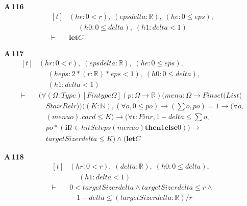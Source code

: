 \noindent\textbf{A\,116}\quad{}
{\footnotesize\[ \begin{aligned}[t]
&(\mathit{hr} : 0<\mathit{r}),\; (\mathit{eps} \mathit{delta} : \mathbb{R} ),\; (\mathit{he} : 0 \leq \mathit{eps}),\\
&\quad \; (\mathit{h0} : 0 \leq \mathit{delta}),\; (\mathit{h1} : \mathit{delta}<1)\\
\vdash\;&\mathbf{let} \mathit{C}
\end{aligned} \]}

\noindent\textbf{A\,117}\quad{}
{\footnotesize\[ \begin{aligned}[t]
&(\mathit{hr} : 0<\mathit{r}),\; (\mathit{eps} \mathit{delta} : \mathbb{R} ),\; (\mathit{he} : 0 \leq \mathit{eps}),\\
&\quad \; (\mathit{heps} : 2*(\mathit{r} : \mathbb{R} )*\mathit{eps}<1),\; (\mathit{h0} : 0 \leq \mathit{delta}),\\
&\quad \; (\mathit{h1} : \mathit{delta}<1)\\
\vdash\;&(\forall (\Omega : \mathit{Type}) [\mathit{Fintype} \Omega ] (\mathit{p} : \Omega \to \mathbb{R} ) (\mathit{menu} : \Omega \to \mathit{Finset} (\mathit{List} (\\
&\quad \mathit{StairRel} \mathit{r}))) (\mathit{K} : \mathbb{N} ), (\forall \mathit{o},0 \leq \mathit{p} \mathit{o}) \to (\textstyle\sum \mathit{o},\mathit{p} \mathit{o})=1 \to (\forall \mathit{o},\\
&\quad (\mathit{menu} \mathit{o}).\mathit{card} \leq \mathit{K}) \to (\forall \mathit{t} : \mathit{Fin} \mathit{r},1-\mathit{delta} \leq \textstyle\sum \mathit{o},\\
&\quad \mathit{p} \mathit{o}*(\mathbf{if} \mathit{t} \in \mathit{hitSet} \mathit{eps} (\mathit{menu} \mathit{o}) \mathbf{then} 1 \mathbf{else} 0)) \to\\
&\quad \mathit{targetSize} \mathit{r} \mathit{delta} \leq \mathit{K}) \wedge (\mathbf{let} \mathit{C}
\end{aligned} \]}

\noindent\textbf{A\,118}\quad{}
{\footnotesize\[ \begin{aligned}[t]
&(\mathit{hr} : 0<\mathit{r}),\; (\mathit{delta} : \mathbb{R} ),\; (\mathit{h0} : 0 \leq \mathit{delta}),\\
&\quad \; (\mathit{h1} : \mathit{delta}<1)\\
\vdash\;&0 < \mathit{targetSize} \mathit{r} \mathit{delta} \wedge \mathit{targetSize} \mathit{r} \mathit{delta} \leq \mathit{r} \wedge\\
&\quad 1-\mathit{delta} \leq (\mathit{targetSize} \mathit{r} \mathit{delta} : \mathbb{R} )/\mathit{r}
\end{aligned} \]}


